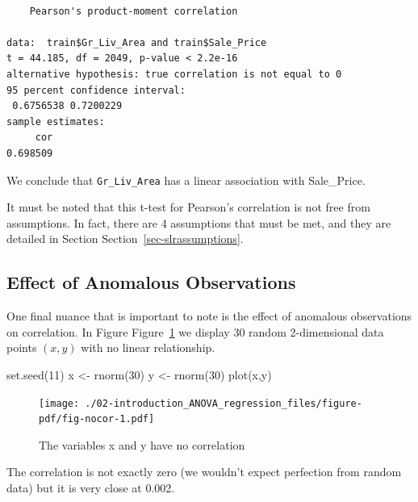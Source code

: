\documentclass[
  letterpaper,
  DIV=11,
  numbers=noendperiod]{scrreprt}
\newenvironment{Shaded}{\begin{snugshade}}{\end{snugshade}}
\newcommand{\DecValTok}[1]{\textcolor[rgb]{0.68,0.00,0.00}{#1}}
\newcommand{\FunctionTok}[1]{\textcolor[rgb]{0.28,0.35,0.67}{#1}}
\newcommand{\NormalTok}[1]{\textcolor[rgb]{0.00,0.23,0.31}{#1}}
\newcommand{\OtherTok}[1]{\textcolor[rgb]{0.00,0.23,0.31}{#1}}
\begin{document}
\begin{verbatim}

    Pearson's product-moment correlation

data:  train$Gr_Liv_Area and train$Sale_Price
t = 44.185, df = 2049, p-value < 2.2e-16
alternative hypothesis: true correlation is not equal to 0
95 percent confidence interval:
 0.6756538 0.7200229
sample estimates:
     cor 
0.698509 
\end{verbatim}

We conclude that \texttt{Gr\_Liv\_Area} has a linear association with
Sale\_Price.

It must be noted that this t-test for Pearson's correlation is not free
from assumptions. In fact, there are 4 assumptions that must be met, and
they are detailed in Section Section~\ref{sec-slrassumptions}.

\hypertarget{effect-of-anomalous-observations}{%
\subsection{Effect of Anomalous
Observations}\label{effect-of-anomalous-observations}}

One final nuance that is important to note is the effect of anomalous
observations on correlation. In Figure Figure~\ref{fig-nocor} we display
30 random 2-dimensional data points \((x,y)\) with no linear
relationship.

\begin{Shaded}
\begin{Highlighting}[]
\FunctionTok{set.seed}\NormalTok{(}\DecValTok{11}\NormalTok{)}
\NormalTok{x }\OtherTok{\textless{}{-}} \FunctionTok{rnorm}\NormalTok{(}\DecValTok{30}\NormalTok{)}
\NormalTok{y }\OtherTok{\textless{}{-}} \FunctionTok{rnorm}\NormalTok{(}\DecValTok{30}\NormalTok{)}
\FunctionTok{plot}\NormalTok{(x,y)}
\end{Highlighting}
\end{Shaded}

\begin{figure}[H]

{\centering \texttt{[image: ./02-introduction\_ANOVA\_regression\_files/figure-pdf/fig-nocor-1.pdf]}

}

\caption{\label{fig-nocor}The variables x and y have no correlation}

\end{figure}

The correlation is not exactly zero (we wouldn't expect perfection from
random data) but it is very close at 0.002.
\end{document}
